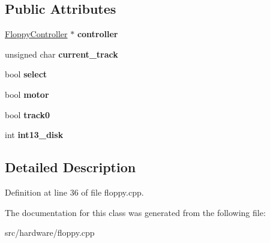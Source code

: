 \subsection*{Public Attributes}
\begin{DoxyCompactItemize}
\item 
\hypertarget{classFloppyDevice_a8ffa0135f4b836426a32b96680dc51a0}{\hyperlink{classFloppyController}{Floppy\-Controller} $\ast$ {\bfseries controller}}\label{classFloppyDevice_a8ffa0135f4b836426a32b96680dc51a0}

\item 
\hypertarget{classFloppyDevice_a34366d0b663e4c660875c22b1f7efa8b}{unsigned char {\bfseries current\-\_\-track}}\label{classFloppyDevice_a34366d0b663e4c660875c22b1f7efa8b}

\item 
\hypertarget{classFloppyDevice_a7af7286e2e7558074b0853a10a37d80f}{bool {\bfseries select}}\label{classFloppyDevice_a7af7286e2e7558074b0853a10a37d80f}

\item 
\hypertarget{classFloppyDevice_a00f5510f11e8fad3b0233c9d3b293fd7}{bool {\bfseries motor}}\label{classFloppyDevice_a00f5510f11e8fad3b0233c9d3b293fd7}

\item 
\hypertarget{classFloppyDevice_a81025c10fec2b1d3f39cba566c89d796}{bool {\bfseries track0}}\label{classFloppyDevice_a81025c10fec2b1d3f39cba566c89d796}

\item 
\hypertarget{classFloppyDevice_aea6d0c8cb2f60c2cc106b0c722d2f8de}{int {\bfseries int13\-\_\-disk}}\label{classFloppyDevice_aea6d0c8cb2f60c2cc106b0c722d2f8de}

\end{DoxyCompactItemize}


\subsection{Detailed Description}


Definition at line 36 of file floppy.\-cpp.



The documentation for this class was generated from the following file\-:\begin{DoxyCompactItemize}
\item 
src/hardware/floppy.\-cpp\end{DoxyCompactItemize}
